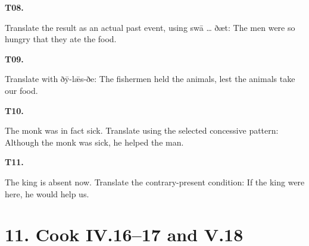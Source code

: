 \par\begin{minipage}{\linewidth}\raggedright
\textbf{T08.}

Translate the result as an actual past event, using swā … ðæt: The men were so hungry that they ate the food.

\end{minipage}\par\addvspace{4pt}

\par\begin{minipage}{\linewidth}\raggedright
\textbf{T09.}

Translate with ðȳ-lǣs-ðe: The fishermen held the animals, lest the animals take our food.

\end{minipage}\par\addvspace{4pt}

\par\begin{minipage}{\linewidth}\raggedright
\textbf{T10.}

The monk was in fact sick. Translate using the selected concessive pattern: Although the monk was sick, he helped the man.

\end{minipage}\par\addvspace{4pt}

\par\begin{minipage}{\linewidth}\raggedright
\textbf{T11.}

The king is absent now. Translate the contrary-present condition: If the king were here, he would help us.

\end{minipage}\par\addvspace{4pt}

\section*{11. Cook IV.16–17 and V.18}


